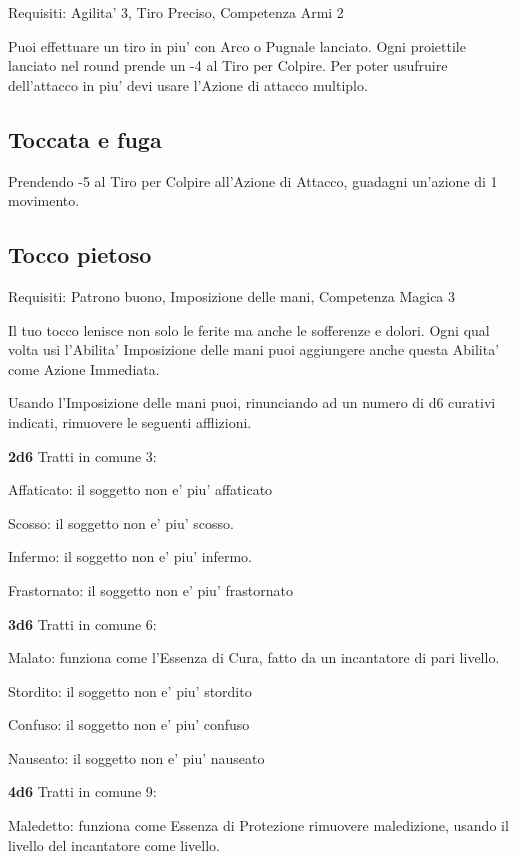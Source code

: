 \documentclass[a4paper,11pt,twoside,openany]{book}
\begin{document}
	Requisiti: Agilita' 3, Tiro Preciso, Competenza Armi 2
	
	Puoi effettuare un tiro in piu' con Arco o Pugnale lanciato. Ogni
	proiettile lanciato nel round prende un -4 al Tiro per Colpire. Per
	poter usufruire dell'attacco in piu' devi usare l'Azione di attacco
	multiplo.
	
	\subsection{Toccata e fuga}
	
	Prendendo -5 al Tiro per Colpire all'Azione di Attacco, guadagni un'azione di 1 movimento.
	
	\subsection{Tocco pietoso}
	
	Requisiti: Patrono buono, Imposizione delle mani, Competenza Magica 3
	
	Il tuo tocco lenisce non solo le ferite ma anche le sofferenze e dolori. Ogni qual volta usi l'Abilita' Imposizione delle mani puoi aggiungere anche questa Abilita' come Azione Immediata.
	
	Usando l'Imposizione delle mani puoi, rinunciando ad un numero di d6 curativi indicati, rimuovere le seguenti afflizioni.
	
	\textbf{2d6} Tratti in comune 3:
	
	Affaticato: il soggetto non e' piu' affaticato
	
	Scosso: il soggetto non e' piu' scosso.
	
	Infermo: il soggetto non e' piu' infermo.
	
	Frastornato: il soggetto non e' piu' frastornato
	
	\textbf{3d6} Tratti in comune 6:
	
	Malato: funziona come l'Essenza di Cura, fatto da un incantatore di pari livello.
	
	Stordito: il soggetto non e' piu' stordito
	
	Confuso: il soggetto non e' piu' confuso
	
	Nauseato: il soggetto non e' piu' nauseato
	
	\textbf{4d6} Tratti in comune 9:
	
	Maledetto: funziona come Essenza di Protezione rimuovere maledizione, usando il livello del incantatore come livello.
	
\end{document}
